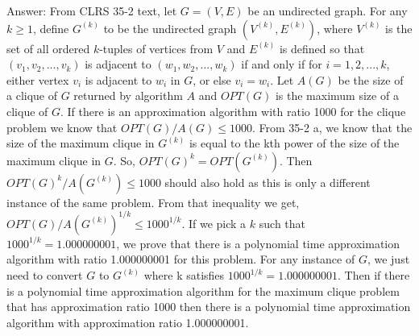 \documentclass{article}
\begin{document}
Answer: From CLRS 35-2 text, let $G = (V, E)$ be an undirected graph. For any $k \geq 1$, define $G^{(k)}$ to be the undirected graph $(V^{(k)}, E^{(k)})$, where $V^{(k)}$ is the set of all ordered $k$-tuples of vertices from $V$ and $E^{(k)}$ is defined so that $(v_1, v_2, . . ., v_k)$ is adjacent to $(w_1, w_2, . . ., w_k)$ if and only if for $i = 1, 2, . . ., k$, either vertex $v_i$ is adjacent to $w_i$ in $G$, or else $v_i = w_i$. Let $A(G)$ be the size of a clique of $G$ returned by algorithm $A$ and $OPT(G)$ is the maximum size of a clique of $G$. If there is an approximation algorithm with ratio 1000 for the clique problem we know that $OPT(G) / A(G) \leq 1000$. From 35-2 a, we know that the size of the maximum clique in $G^{(k)}$ is equal to the kth power of the size of the maximum clique in $G$. So, ${OPT(G)}^k = OPT(G^{(k)})$. Then ${OPT(G)}^k / A(G^{(k)}) \leq 1000$ should also hold as this is only a different instance of the same problem. From that inequality we get, ${OPT(G)} / {A(G^{(k)})}^{1/k} \leq {1000}^{1/k}$. If we pick a $k$ such that ${1000}^{1/k} = 1.000000001$, we prove that there is a polynomial time approximation algorithm with ratio 1.000000001 for this problem. For any instance of $G$, we just need to convert $G$ to $G^{(k)}$ where k satisfies ${1000}^{1/k} = 1.000000001$. Then if there is a polynomial time approximation algorithm for the maximum clique problem that has approximation ratio 1000 then there is a polynomial time approximation algorithm with approximation ratio 1.000000001. \\ \newline
\end{document}
